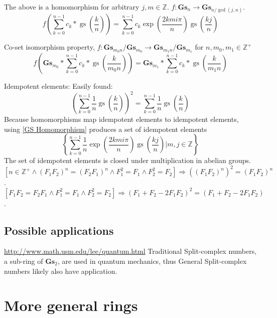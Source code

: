 \documentclass[]{article}
\DeclareMathOperator{\gs}{gs}
\newcommand{\pqty}[1]{{\left(#1\right)}}
\newcommand{\Bqty}[1]{{\left\{#1\right\}}}
\newcommand{\bqty}[1]{{\left[#1\right]}}
\numberwithin{equation}{section}
\begin{document}
	The above is a homomorphism for arbitrary $j,m\in\mathbb{Z}$. $f:\mathbf{Gs}_n\rightarrow\mathbf{Gs}_{n/\gcd\pqty{j,n}}$.
	\begin{equation}
	\label{GS Homomorphism}
	f\pqty{\sum_{k=0}^{n-1} c_k*\gs\pqty{\frac{k}{n}}}=\sum_{k=0}^{n-1} c_k\exp\pqty{\frac{2kmi\pi}{n}}\gs\pqty{\frac{kj}{n}}
	\end{equation}
	
	Co-set isomorphism property, $f:\mathbf{Gs}_{m_0n}/\mathbf{Gs}_{m_0}\rightarrow \mathbf{Gs}_{m_1n}/\mathbf{Gs}_{m_1}$ for $n,m_0,m_1\in\mathbb{Z}^+$
	\begin{equation}
	f\pqty{\mathbf{Gs}_{m_0}*\sum_{k=0}^{n-1} c_k*\gs\pqty{\frac{k}{m_0n}}}=\mathbf{Gs}_{m_1}*\sum_{k=0}^{n-1} c_k*\gs\pqty{\frac{k}{m_1n}}
	\end{equation}
	
	Idempotent elements: Easily found:
	\begin{equation}
	\pqty{\sum_{k=0}^{n-1}\frac{1}{n}\gs\pqty{\frac{k}{n}}}^2
	=
	\sum_{k=0}^{n-1}\frac{1}{n}\gs\pqty{\frac{k}{n}}
	\end{equation}
	Because homomorphisms map idempotent elements to idempotent elements, using \eqref{GS Homomorphism} produces a set of idempotent elements
	\begin{equation}
	\Bqty{ \sum_{k=0}^{n-1} \frac{1}{n}\exp\pqty{\frac{2kmi\pi}{n}}\gs\pqty{\frac{kj}{n}} \Bigg\vert m,j\in\mathbb{Z} }
	\end{equation}
	The set of idempotent elements is closed under multiplication in abelian groups.
	\begin{equation}
	\bqty{n\in\mathbb{Z}^+\land\pqty{F_1F_2}^n=\pqty{F_2F_1}^n\land F_1^2=F_1\land F_2^2=F_2}\Rightarrow \pqty{\pqty{F_1F_2}^n}^2=\pqty{F_1F_2}^n
	\end{equation}.
	\begin{equation}
	\bqty{F_1F_2=F_2F_1\land F_1^2=F_1\land F_2^2=F_2}\Rightarrow \pqty{{F_1+F_2-2F_1F_2}}^2=\pqty{F_1+F_2-2F_1F_2}
	\end{equation}.
	
	\subsection{Possible applications}
	\url{http://www.math.usm.edu/lee/quantum.html} Traditional Split-complex numbers, a sub-ring of $\mathbf{Gs}_2$, are used in quantum mechanics, thus General Split-complex numbers likely also have application.
	
	\section{More general rings}
\end{document}

